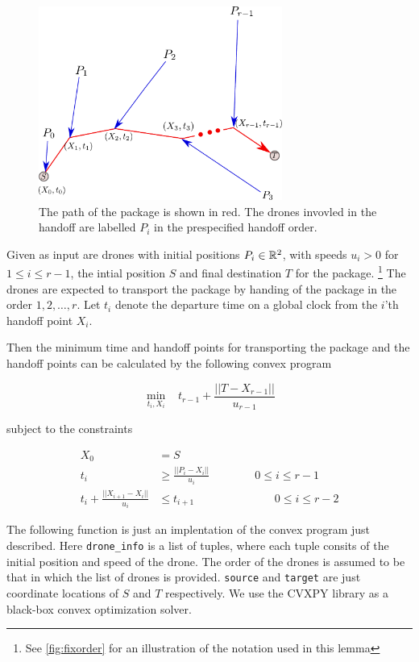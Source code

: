 \documentclass[10pt, english, oneside]{report}
\begin{document}
\begin{figure}[H]
\centering
\includegraphics[width=8cm]{docs/pho-cvx.pdf}
\caption{The path of the package is shown in red. The drones invovled in the handoff are 
labelled $P_i$ in the prespecified handoff order.}
\end{figure}
\label{fig:fixorder}

\begin{flem} \label{lem:fixorder}
Given as input are drones with initial positions $P_i \in \mathbb{R}^2$, with speeds $u_i>0$ 
for  $1 \leq i \leq r-1$, the intial position $S$ and final destination $T$ 
for the package. \footnote{See \autoref{fig:fixorder} for an illustration of the notation used in this lemma} 
The drones are expected to transport the package by handing of the package in the order $1,2,\ldots, r$.
Let $t_i$ denote the departure time on a global clock from the $i$'th handoff point $X_i$. 

Then the minimum time and handoff points for transporting the package and the handoff points 
can be calculated by the following convex program

\begin{equation*}
\min_{t_i, X_i} \; \; \; t_{r-1} + \frac{||T-X_{r-1}||}{u_{r-1}}
\end{equation*}

subject to the constraints

\begin{align*}
X_0 &= S\\  
t_i &\geq \frac{||P_i-X_i||}{u_i} \qquad \qquad 0 \leq i \leq r-1\\
t_i + \frac{||X_{i+1}-X_i||}{u_i} &\leq t_{i+1} \qquad \qquad \qquad \;\;\;\; 0 \leq i \leq r-2
\end{align*}

\end{flem}


The following function is just an implentation of the convex program just described. 
Here \verb|drone_info| is a list 
of tuples, where each tuple consits of the initial position and speed of the drone. The order of the 
drones is assumed to be that in which the list of drones is provided. \verb|source| and \verb|target|
are just coordinate locations of $S$ and $T$ respectively. We use the CVXPY \cite{cvxpy} library 
as a black-box convex optimization solver. 
\end{document}
